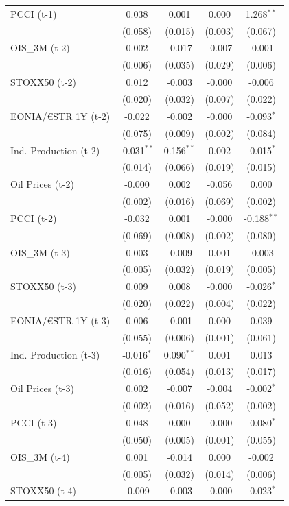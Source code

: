 \begin{longtable}[t]{lcccc}
PCCI (t-1) & 0.038 & 0.001 & 0.000 & 1.268$^{**}$\\
 & (0.058) & (0.015) & (0.003) & (0.067)\\
OIS\_3M (t-2) & 0.002 & -0.017 & -0.007 & -0.001\\
 & (0.006) & (0.035) & (0.029) & (0.006)\\
STOXX50 (t-2) & 0.012 & -0.003 & -0.000 & -0.006\\
 & (0.020) & (0.032) & (0.007) & (0.022)\\
EONIA/€STR 1Y (t-2) & -0.022 & -0.002 & -0.000 & -0.093$^{*}$\\
 & (0.075) & (0.009) & (0.002) & (0.084)\\
Ind. Production (t-2) & -0.031$^{**}$ & 0.156$^{**}$ & 0.002 & -0.015$^{*}$\\
 & (0.014) & (0.066) & (0.019) & (0.015)\\
Oil Prices (t-2) & -0.000 & 0.002 & -0.056 & 0.000\\
 & (0.002) & (0.016) & (0.069) & (0.002)\\
PCCI (t-2) & -0.032 & 0.001 & -0.000 & -0.188$^{**}$\\
 & (0.069) & (0.008) & (0.002) & (0.080)\\
OIS\_3M (t-3) & 0.003 & -0.009 & 0.001 & -0.003\\
 & (0.005) & (0.032) & (0.019) & (0.005)\\
STOXX50 (t-3) & 0.009 & 0.008 & -0.000 & -0.026$^{*}$\\
 & (0.020) & (0.022) & (0.004) & (0.022)\\
EONIA/€STR 1Y (t-3) & 0.006 & -0.001 & 0.000 & 0.039\\
 & (0.055) & (0.006) & (0.001) & (0.061)\\
Ind. Production (t-3) & -0.016$^{*}$ & 0.090$^{**}$ & 0.001 & 0.013\\
 & (0.016) & (0.054) & (0.013) & (0.017)\\
Oil Prices (t-3) & 0.002 & -0.007 & -0.004 & -0.002$^{*}$\\
 & (0.002) & (0.016) & (0.052) & (0.002)\\
PCCI (t-3) & 0.048 & 0.000 & -0.000 & -0.080$^{*}$\\
 & (0.050) & (0.005) & (0.001) & (0.055)\\
OIS\_3M (t-4) & 0.001 & -0.014 & 0.000 & -0.002\\
 & (0.005) & (0.032) & (0.014) & (0.006)\\
STOXX50 (t-4) & -0.009 & -0.003 & -0.000 & -0.023$^{*}$\\

\end{longtable}
